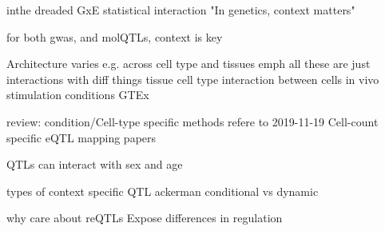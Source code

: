 \begin{outline}
\1 inthe dreaded GxE statistical interaction
    \2 "In genetics, context matters"

    \2 for both gwas, and molQTLs, context is key

\1 Architecture varies e.g. across cell type and tissues
\1 emph all these are just interactions with diff things
    \2 tissue
    \2 cell type
    \2 interaction between cells in vivo
    \2 stimulation conditions
    GTEx

review: condition/Cell-type specific methods
    refere to 2019-11-19 Cell-count specific eQTL mapping papers

\1 QTLs can interact with sex and age

\1 types of context specific QTL
    \2 ackerman conditional vs dynamic

\1 why care about reQTLs
Expose differences in regulation




\end{outline}
